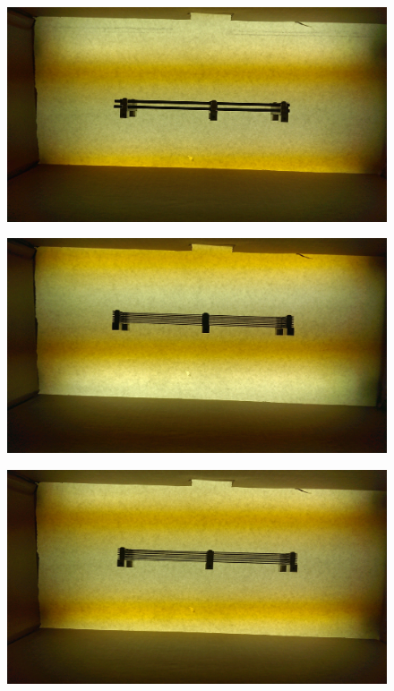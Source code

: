 \documentclass[10pt]{scrartcl}
\begin{document}
\begin{figure}[!ht]
    \centering
    \includegraphics[width=\textwidth]{../plots_tables_images/slats/IMAG0137_BURST010.jpg}
    \caption{}
\end{figure}
\begin{figure}[!ht]
    \centering
    \includegraphics[width=\textwidth]{../plots_tables_images/slats/IMAG0122.jpg}    
    \caption{}
\end{figure}
\begin{figure}[!ht]
    \centering
    \includegraphics[width=\textwidth]{../plots_tables_images/slats/IMAG0128.jpg}
    \caption{}
\end{figure}
\end{document}
